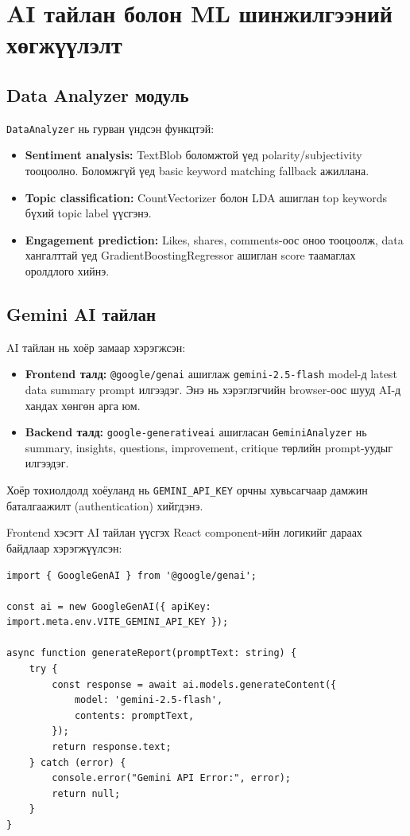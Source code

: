 \section{AI тайлан болон ML шинжилгээний хөгжүүлэлт}

\subsection{Data Analyzer модуль}
\texttt{DataAnalyzer} нь гурван үндсэн функцтэй:
\begin{itemize}
    \item \textbf{Sentiment analysis:} TextBlob боломжтой үед polarity/subjectivity тооцоолно. Боломжгүй үед basic keyword matching fallback ажиллана.
    \item \textbf{Topic classification:} CountVectorizer болон LDA ашиглан top keywords бүхий topic label үүсгэнэ.
    \item \textbf{Engagement prediction:} Likes, shares, comments-оос оноо тооцоолж, data хангалттай үед GradientBoostingRegressor ашиглан score таамаглах оролдлого хийнэ.
\end{itemize}

\subsection{Gemini AI тайлан}
AI тайлан нь хоёр замаар хэрэгжсэн:
\begin{itemize}
    \item \textbf{Frontend талд:} \texttt{@google/genai} ашиглаж \texttt{gemini-2.5-flash} model-д latest data summary prompt илгээдэг. Энэ нь хэрэглэгчийн browser-оос шууд AI-д хандах хөнгөн арга юм.
    \item \textbf{Backend талд:} \texttt{google-generativeai} ашигласан \texttt{GeminiAnalyzer} нь summary, insights, questions, improvement, critique төрлийн prompt-уудыг илгээдэг.
\end{itemize}
Хоёр тохиолдолд хоёуланд нь \texttt{GEMINI\_API\_KEY} орчны хувьсагчаар дамжин баталгаажилт (authentication) хийгдэнэ.

Frontend хэсэгт AI тайлан үүсгэх React component-ийн логикийг дараах байдлаар хэрэгжүүлсэн:

\begin{verbatim}
import { GoogleGenAI } from '@google/genai';

const ai = new GoogleGenAI({ apiKey: import.meta.env.VITE_GEMINI_API_KEY });

async function generateReport(promptText: string) {
    try {
        const response = await ai.models.generateContent({
            model: 'gemini-2.5-flash',
            contents: promptText,
        });
        return response.text;
    } catch (error) {
        console.error("Gemini API Error:", error);
        return null;
    }
}
\end{verbatim}

